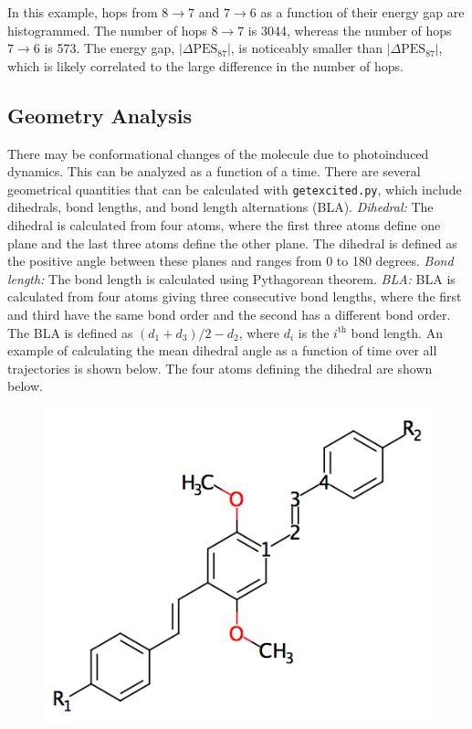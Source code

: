 \documentclass[letterpaper,12pt,titlepage]{article}
\begin{document}
In this example, hops from $8\rightarrow7$ and $7\rightarrow6$ as a function of their energy gap are histogrammed.  The number of hops $8\rightarrow7$ is 3044, whereas the number of hops $7\rightarrow6$ is 573.  The energy gap, $|\Delta\text{PES}_{87}|$, is noticeably smaller than $|\Delta\text{PES}_{87}|$, which is likely correlated to the large difference in the number of hops.

\subsection{Geometry Analysis}
There may be conformational changes of the molecule due to photoinduced dynamics.  This can be analyzed as a function of a time.  There are several geometrical quantities that can be calculated with \verb+getexcited.py+, which include dihedrals, bond lengths, and bond length alternations (BLA).  \textit{Dihedral:} The dihedral is calculated from four atoms, where the first three atoms define one plane and the last three atoms define the other plane.  The dihedral is defined as the positive angle between these planes and ranges from 0 to 180 degrees.  \textit{Bond length:} The bond length is calculated using Pythagorean theorem.  \textit{BLA:} BLA is calculated from four atoms giving three consecutive bond lengths, where the first and third have the same bond order and the second has a different bond order.  The BLA is defined as $\left(d_{1}+d_{3}\right)/2 - d_{2}$, where $d_{i}$ is the $i^{\text{th}}$ bond length.  An example of calculating the mean dihedral angle as a function of time over all trajectories is shown below.  The four atoms defining the dihedral are shown below.
\begin{figure}[h]
	\centering 
	\includegraphics[scale=.50]{asymm_dihedral.png}
\end{figure}
\end{document}
